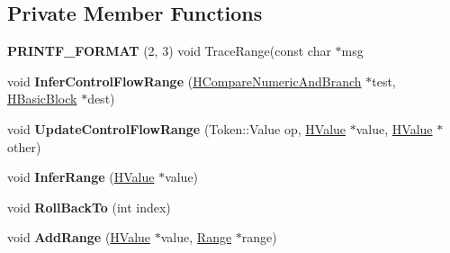 \subsection*{Private Member Functions}
\begin{DoxyCompactItemize}
\item 
{\bfseries P\+R\+I\+N\+T\+F\+\_\+\+F\+O\+R\+M\+AT} (2, 3) void Trace\+Range(const char $\ast$msg\hypertarget{classv8_1_1internal_1_1_h_range_analysis_phase_a9c395f9a8141c92a19f2cd994faf9fb0}{}\label{classv8_1_1internal_1_1_h_range_analysis_phase_a9c395f9a8141c92a19f2cd994faf9fb0}

\item 
void {\bfseries Infer\+Control\+Flow\+Range} (\hyperlink{classv8_1_1internal_1_1_h_compare_numeric_and_branch}{H\+Compare\+Numeric\+And\+Branch} $\ast$test, \hyperlink{classv8_1_1internal_1_1_h_basic_block}{H\+Basic\+Block} $\ast$dest)\hypertarget{classv8_1_1internal_1_1_h_range_analysis_phase_ab9b3ec91d55ccd55b5979f9c8ee0314e}{}\label{classv8_1_1internal_1_1_h_range_analysis_phase_ab9b3ec91d55ccd55b5979f9c8ee0314e}

\item 
void {\bfseries Update\+Control\+Flow\+Range} (Token\+::\+Value op, \hyperlink{classv8_1_1internal_1_1_h_value}{H\+Value} $\ast$value, \hyperlink{classv8_1_1internal_1_1_h_value}{H\+Value} $\ast$other)\hypertarget{classv8_1_1internal_1_1_h_range_analysis_phase_a2a8f42ba01fc6d918af5f11ddf852646}{}\label{classv8_1_1internal_1_1_h_range_analysis_phase_a2a8f42ba01fc6d918af5f11ddf852646}

\item 
void {\bfseries Infer\+Range} (\hyperlink{classv8_1_1internal_1_1_h_value}{H\+Value} $\ast$value)\hypertarget{classv8_1_1internal_1_1_h_range_analysis_phase_aee0eed83360e7092ae2716e44f6ed869}{}\label{classv8_1_1internal_1_1_h_range_analysis_phase_aee0eed83360e7092ae2716e44f6ed869}

\item 
void {\bfseries Roll\+Back\+To} (int index)\hypertarget{classv8_1_1internal_1_1_h_range_analysis_phase_aecb9e4359cfd049c18721289545eef8a}{}\label{classv8_1_1internal_1_1_h_range_analysis_phase_aecb9e4359cfd049c18721289545eef8a}

\item 
void {\bfseries Add\+Range} (\hyperlink{classv8_1_1internal_1_1_h_value}{H\+Value} $\ast$value, \hyperlink{classv8_1_1internal_1_1_range}{Range} $\ast$range)\hypertarget{classv8_1_1internal_1_1_h_range_analysis_phase_aafbfba06696aa24cf719161f052a8eaa}{}\label{classv8_1_1internal_1_1_h_range_analysis_phase_aafbfba06696aa24cf719161f052a8eaa}


\end{DoxyCompactItemize}
